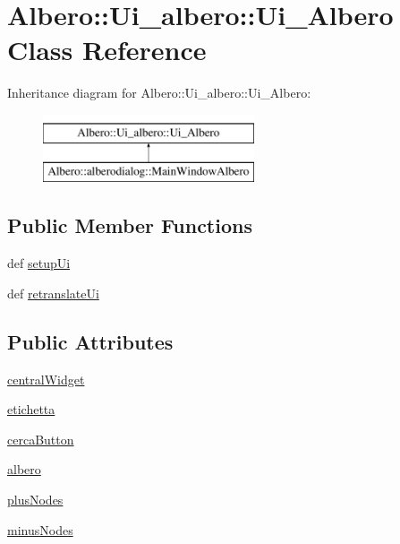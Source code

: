 \hypertarget{classAlbero_1_1Ui__albero_1_1Ui__Albero}{
\section{Albero::Ui\_\-albero::Ui\_\-Albero Class Reference}
\label{classAlbero_1_1Ui__albero_1_1Ui__Albero}
}
Inheritance diagram for Albero::Ui\_\-albero::Ui\_\-Albero:\begin{figure}[H]
\begin{center}
\leavevmode
\includegraphics[height=2.000000cm]{classAlbero_1_1Ui__albero_1_1Ui__Albero}
\end{center}
\end{figure}
\subsection*{Public Member Functions}
\begin{DoxyCompactItemize}
\item 
def \hyperlink{classAlbero_1_1Ui__albero_1_1Ui__Albero_a25831bda06b7aeb8a8a86e5441f37291}{setupUi}
\item 
def \hyperlink{classAlbero_1_1Ui__albero_1_1Ui__Albero_a3e0efe94e5f2524d2cef183ab32a8b6a}{retranslateUi}
\end{DoxyCompactItemize}
\subsection*{Public Attributes}
\begin{DoxyCompactItemize}
\item 
\hyperlink{classAlbero_1_1Ui__albero_1_1Ui__Albero_a6ef6de52a8c8a147cc37484ced6e5404}{centralWidget}
\item 
\hyperlink{classAlbero_1_1Ui__albero_1_1Ui__Albero_acacc8f6f883b8f5e78e9ad8a8a79cf0a}{etichetta}
\item 
\hyperlink{classAlbero_1_1Ui__albero_1_1Ui__Albero_a4b588eb42690d12d9c84ee9dba1e45d4}{cercaButton}
\item 
\hyperlink{classAlbero_1_1Ui__albero_1_1Ui__Albero_adcb804cc950de7ab56df6d090337b6cb}{albero}
\item 
\hyperlink{classAlbero_1_1Ui__albero_1_1Ui__Albero_a3925424b16ebe074feaaf16ea5b82184}{plusNodes}
\item 
\hyperlink{classAlbero_1_1Ui__albero_1_1Ui__Albero_a6dce3a758b42101f8a6423c6463aae1c}{minusNodes}
\end{DoxyCompactItemize}


